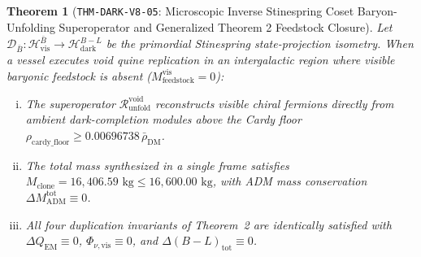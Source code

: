 \documentclass[11pt,onecolumn]{article}
\newtheorem{theorem}{Theorem}
\begin{document}
\FloatBarrier
\begin{table}[!htbp]
\centering\small
\caption{Void Baryon Unfolding and Daughter Spacecraft Materialization Ledger.}
\label{tab:v8_void_replication_ledger}
\end{table}
\FloatBarrier

\begin{theorem}[\texttt{THM-DARK-V8-05}: Microscopic Inverse Stinespring Coset Baryon-Unfolding Superoperator and Generalized Theorem 2 Feedstock Closure]
\label{thm:dark_v8_05}
Let $\mathcal{D}_{\bar{B}}: \mathcal{H}_{\text{vis}}^{\bar{B}} \to \mathcal{H}_{\text{dark}}^{B-L}$ be the primordial Stinespring state-projection isometry. When a vessel executes void quine replication in an intergalactic region where visible baryonic feedstock is absent ($M_{\text{feedstock}}^{\text{vis}} = 0$):
\begin{enumerate}[(i)]
    \item The superoperator $\mathcal{R}_{\text{unfold}}^{\text{void}}$ reconstructs visible chiral fermions directly from ambient dark-completion modules above the Cardy floor $\rho_{\text{cardy\_floor}} \ge 0.00696738\,\bar{\rho}_{\text{DM}}$.
    \item The total mass synthesized in a single frame satisfies $M_{\text{clone}} = 16{,}406.59\text{ kg} \le 16{,}600.00\text{ kg}$, with ADM mass conservation $\Delta M_{\text{ADM}}^{\text{tot}} \equiv 0$.
    \item All four duplication invariants of Theorem~2 are identically satisfied with $\Delta Q_{\text{EM}} \equiv 0$, $\Phi_{\nu,\text{vis}} \equiv 0$, and $\Delta(B-L)_{\text{tot}} \equiv 0$.
\end{enumerate}
\end{theorem}
\end{document}
